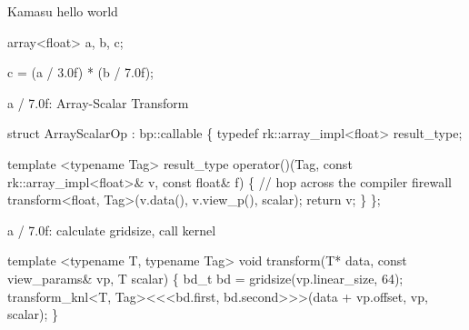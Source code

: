\begin{frame}[fragile]{Kamasu hello world}
\begin{semiverbatim}

array<float> a, b, c;

\alert<2>{c = (a / 3.0f) * (b / 7.0f);}

\end{semiverbatim}
\note{

}
\end{frame}

\begin{frame}[fragile]{a / 7.0f:  Array-Scalar Transform}
\begin{semiverbatim}

struct ArrayScalarOp : bp::callable
\{
  typedef rk::array_impl<float> result_type;

  template <typename Tag>
  result_type 
  operator()(Tag, const rk::array_impl<float>& v, 
             const float& f)
  \{
    // hop across the compiler firewall
    transform<float, Tag>(v.data(), v.view_p(), scalar);
    return v;
  \}
\};


\end{semiverbatim}
\end{frame}


\begin{frame}[fragile]{a / 7.0f: calculate gridsize, call kernel}
\begin{semiverbatim}
template <typename T, typename Tag>
void 
transform(T* data, const view_params& vp, T scalar)
\{
   bd_t bd = gridsize(vp.linear_size, 64);
   transform_knl<T, Tag><\hskip0pt<\hskip0pt<bd.first, 
                           bd.second>\hskip0pt>\hskip0pt>(data + vp.offset, 
                                        vp, scalar);
\}
\end{semiverbatim}
\note{ 
}
\end{frame}

